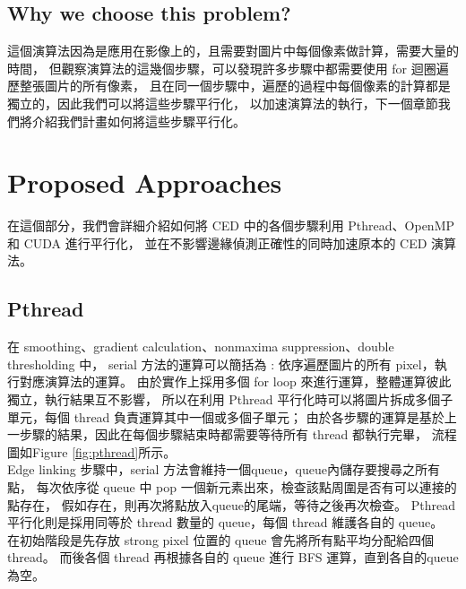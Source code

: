 \documentclass[sigconf,nonacm]{acmart}
\begin{document}
\subsection{Why we choose this problem?}

這個演算法因為是應用在影像上的，且需要對圖片中每個像素做計算，需要大量的時間，
但觀察演算法的這幾個步驟，可以發現許多步驟中都需要使用 for 迴圈遍歷整張圖片的所有像素，
且在同一個步驟中，遍歷的過程中每個像素的計算都是獨立的，因此我們可以將這些步驟平行化，
以加速演算法的執行，下一個章節我們將介紹我們計畫如何將這些步驟平行化。

\section{Proposed Approaches}

在這個部分，我們會詳細介紹如何將 CED 中的各個步驟利用 Pthread、OpenMP 和 CUDA 進行平行化，
並在不影響邊緣偵測正確性的同時加速原本的 CED 演算法。

\subsection{Pthread}

在 smoothing、gradient calculation、nonmaxima suppression、double thresholding 中，
serial 方法的運算可以簡括為 : 依序遍歷圖片的所有 pixel，執行對應演算法的運算。
由於實作上採用多個 for loop 來進行運算，整體運算彼此獨立，執行結果互不影響，
所以在利用 Pthread 平行化時可以將圖片拆成多個子單元，每個 thread 負責運算其中一個或多個子單元；
由於各步驟的運算是基於上一步驟的結果，因此在每個步驟結束時都需要等待所有 thread 都執行完畢，
流程圖如Figure \ref{fig:pthread}所示。\\
Edge linking 步驟中，serial 方法會維持一個queue，queue內儲存要搜尋之所有點，
每次依序從 queue 中 pop 一個新元素出來，檢查該點周圍是否有可以連接的點存在，
假如存在，則再次將點放入queue的尾端，等待之後再次檢查。
Pthread 平行化則是採用同等於 thread 數量的 queue，每個 thread 維護各自的 queue。
在初始階段是先存放 strong pixel 位置的 queue 會先將所有點平均分配給四個 thread。
而後各個 thread 再根據各自的 queue 進行 BFS 運算，直到各自的queue為空。
\end{document}
